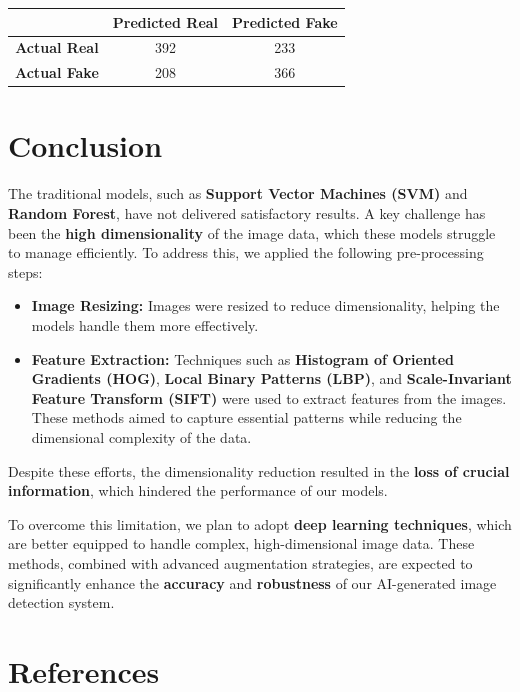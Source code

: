 \documentclass[10pt,twocolumn,letterpaper]{article}
\begin{document}
\begin{table}[h]
    \centering
    \begin{tabular}{|c|c|c|}
        \hline
        & \textbf{Predicted Real} & \textbf{Predicted Fake} \\ \hline
        \textbf{Actual Real} & 392 & 233 \\ \hline
        \textbf{Actual Fake} & 208 & 366 \\ \hline
    \end{tabular}
\end{table}


\section{Conclusion}
The traditional models, such as \textbf{Support Vector Machines (SVM)} and \textbf{Random Forest}, have not delivered satisfactory results. A key challenge has been the \textbf{high dimensionality} of the image data, which these models struggle to manage efficiently. To address this, we applied the following pre-processing steps:

\begin{itemize}
    \item \textbf{Image Resizing:} Images were resized to reduce dimensionality, helping the models handle them more effectively.
    \item \textbf{Feature Extraction:} Techniques such as \textbf{Histogram of Oriented Gradients (HOG)}, \textbf{Local Binary Patterns (LBP)}, and \textbf{Scale-Invariant Feature Transform (SIFT)} were used to extract features from the images. These methods aimed to capture essential patterns while reducing the dimensional complexity of the data.
\end{itemize}

Despite these efforts, the dimensionality reduction resulted in the \textbf{loss of crucial information}, which hindered the performance of our models.

To overcome this limitation, we plan to adopt \textbf{deep learning techniques}, which are better equipped to handle complex, high-dimensional image data. These methods, combined with advanced augmentation strategies, are expected to significantly enhance the \textbf{accuracy} and \textbf{robustness} of our AI-generated image detection system.

\section{References}
\end{document}
